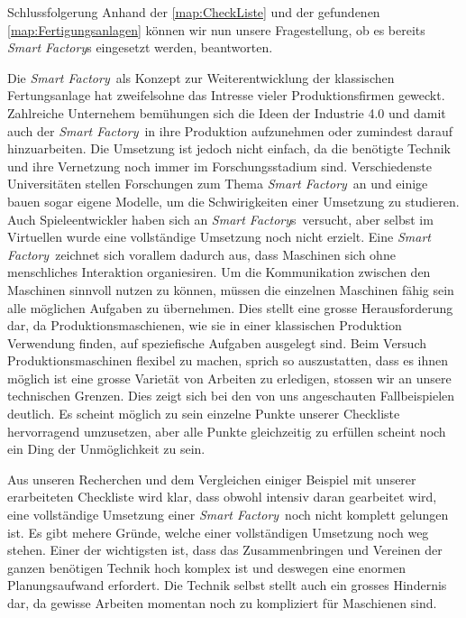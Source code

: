 \documentclass{article}
\def\SmartFactory{\textcolor{DarkestGray}{\textit{Smart Factory}}}
\begin{document}
\begin{Map}{Schlussfolgerung}
Anhand der \ref{map:CheckListe} und der gefundenen \ref{map:Fertigungsanlagen} können wir nun unsere Fragestellung, ob es bereits \SmartFactory s eingesetzt werden, beantworten. \par

Die \SmartFactory\ als Konzept zur Weiterentwicklung der klassischen Fertungsanlage hat zweifelsohne das Intresse vieler Produktionsfirmen geweckt. Zahlreiche Unternehem bemühungen sich die Ideen der Industrie 4.0 und damit auch der \SmartFactory\ in ihre Produktion aufzunehmen oder zumindest darauf hinzuarbeiten. Die Umsetzung ist jedoch nicht einfach, da die benötigte Technik und ihre Vernetzung noch immer im Forschungsstadium sind. Verschiedenste Universitäten stellen Forschungen zum Thema \SmartFactory\ an und einige bauen sogar eigene Modelle, um die Schwirigkeiten einer Umsetzung zu studieren. Auch Spieleentwickler haben sich an \SmartFactory s\ versucht, aber selbst im Virtuellen wurde eine vollständige Umsetzung noch nicht erzielt. Eine \SmartFactory\ zeichnet sich vorallem dadurch aus, dass Maschinen sich ohne menschliches Interaktion organiesiren. Um die Kommunikation zwischen den Maschinen sinnvoll nutzen zu können, müssen die einzelnen Maschinen fähig sein alle möglichen Aufgaben zu übernehmen. Dies stellt eine grosse Herausforderung dar, da Produktionsmaschienen, wie sie in einer klassischen Produktion Verwendung finden, auf speziefische Aufgaben ausgelegt sind. Beim Versuch Produktionsmaschinen flexibel zu machen, sprich so auszustatten, dass es ihnen möglich ist eine grosse Varietät von Arbeiten zu erledigen, stossen wir an unsere technischen Grenzen. Dies zeigt sich bei den von uns angeschauten Fallbeispielen deutlich. Es scheint möglich zu sein einzelne Punkte unserer Checkliste hervorragend umzusetzen, aber alle Punkte gleichzeitig zu erfüllen scheint noch ein Ding der Unmöglichkeit zu sein.

Aus unseren Recherchen und dem Vergleichen einiger Beispiel mit unserer erarbeiteten Checkliste wird klar, dass obwohl intensiv daran gearbeitet wird, eine vollständige Umsetzung einer \SmartFactory\ noch nicht komplett gelungen ist. Es gibt mehere Gründe, welche einer vollständigen Umsetzung noch weg stehen. Einer der wichtigsten ist, dass das Zusammenbringen und Vereinen der ganzen benötigen Technik hoch komplex ist und deswegen eine enormen Planungsaufwand erfordert. Die Technik selbst stellt auch ein grosses Hindernis dar, da gewisse Arbeiten momentan noch zu kompliziert für Maschienen sind. 
\end{Map}
\end{document}
